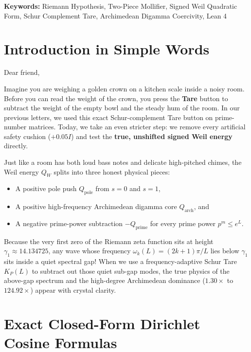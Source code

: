 \documentclass[11pt,a4paper]{article}
\begin{document}
\vspace{0.8em}
\noindent\textbf{Keywords:} Riemann Hypothesis, Two-Piece Mollifier, Signed Weil Quadratic Form, Schur Complement Tare, Archimedean Digamma Coercivity, Lean 4

\section{Introduction in Simple Words}

Dear friend,

Imagine you are weighing a golden crown on a kitchen scale inside a noisy room. Before you can read the weight of the crown, you press the \textbf{Tare} button to subtract the weight of the empty bowl and the steady hum of the room. In our previous letters, we used this exact Schur-complement Tare button on prime-number matrices. Today, we take an even stricter step: we remove every artificial safety cushion ($+0.05 I$) and test the \textbf{true, unshifted signed Weil energy} directly.

Just like a room has both loud bass notes and delicate high-pitched chimes, the Weil energy $Q_W$ splits into three honest physical pieces:
\begin{itemize}
  \item A positive pole push $Q_{\mathrm{pole}}$ from $s = 0$ and $s = 1$,
  \item A positive high-frequency Archimedean digamma core $Q_{\mathrm{arch}}$, and
  \item A negative prime-power subtraction $-Q_{\mathrm{prime}}$ for every prime power $p^m \le e^L$.
\end{itemize}
Because the very first zero of the Riemann zeta function sits at height $\gamma_1 \approx 14.134725$, any wave whose frequency $\omega_k(L) = (2k+1)\pi/L$ lies below $\gamma_1$ sits inside a quiet spectral gap! When we use a frequency-adaptive Schur Tare $K_P(L)$ to subtract out those quiet sub-gap modes, the true physics of the above-gap spectrum and the high-degree Archimedean dominance ($1.30\times$ to $124.92\times$) appear with crystal clarity.

\section{Exact Closed-Form Dirichlet Cosine Formulas}
\end{document}

